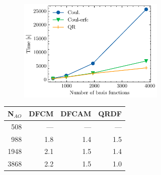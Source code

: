 \begin{figure}[htp]

\begin{subfigure}{\textwidth}
\begin{subfigure}{0.45\textwidth}
\centering
\includegraphics[width=\textwidth]{Pics/adctime_acid}
\end{subfigure}
\hfill
\begin{subtable}{0.45\textwidth}
\centering
\begin{tabular}{rrrr}
\hline
N$_{AO}$ & DFCM & DFCAM & QRDF \\ \hline
508 & --- & --- & --- \\ 
988 & 1.8 & 1.4 & 1.5 \\ 
1948 & 2.1 & 1.5 & 1.4 \\ 
3868 & 2.2 & 1.5 & 1.0 \\
 \hline
\end{tabular}
\end{subtable}
\caption{}
\label{fig:ES_TIME_LCA}
\end{subfigure}

\vspace{1.5\baselineskip}


\end{figure}
